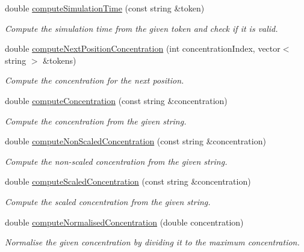\begin{DoxyCompactItemize}
double \hyperlink{classmultiscale_1_1video_1_1RectangularCsvToInputFilesConverter_aac755ecce42a0b8772de0716ff310e2b}{compute\-Simulation\-Time} (const string \&token)
\begin{DoxyCompactList}\small\item\em \-Compute the simulation time from the given token and check if it is valid. \end{DoxyCompactList}\item 
double \hyperlink{classmultiscale_1_1video_1_1RectangularCsvToInputFilesConverter_a0e0c0245ace5606623e8912b1458d3d4}{compute\-Next\-Position\-Concentration} (int concentration\-Index, vector$<$ string $>$ \&tokens)
\begin{DoxyCompactList}\small\item\em \-Compute the concentration for the next position. \end{DoxyCompactList}\item 
double \hyperlink{classmultiscale_1_1video_1_1RectangularCsvToInputFilesConverter_ab6fae5f617920d8f09cfab347b6b4e54}{compute\-Concentration} (const string \&concentration)
\begin{DoxyCompactList}\small\item\em \-Compute the concentration from the given string. \end{DoxyCompactList}\item 
double \hyperlink{classmultiscale_1_1video_1_1RectangularCsvToInputFilesConverter_a13f67ac3ecd8f02322ee04befe4935e8}{compute\-Non\-Scaled\-Concentration} (const string \&concentration)
\begin{DoxyCompactList}\small\item\em \-Compute the non-\/scaled concentration from the given string. \end{DoxyCompactList}\item 
double \hyperlink{classmultiscale_1_1video_1_1RectangularCsvToInputFilesConverter_a34a7ab9fbff04a3c254d5117b3268393}{compute\-Scaled\-Concentration} (const string \&concentration)
\begin{DoxyCompactList}\small\item\em \-Compute the scaled concentration from the given string. \end{DoxyCompactList}\item 
double \hyperlink{classmultiscale_1_1video_1_1RectangularCsvToInputFilesConverter_a06e8db122fd188559d619108127fc318}{compute\-Normalised\-Concentration} (double concentration)
\begin{DoxyCompactList}\small\item\em \-Normalise the given concentration by dividing it to the maximum concentration. \end{DoxyCompactList}\item 

\end{DoxyCompactItemize}
